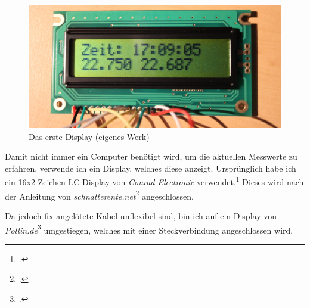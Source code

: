 \begin{figure}[h]
  \centering
     \includegraphics[width=\textwidth]{figures/erstes_display.jpg}
  \caption{Das erste Display (eigenes Werk)}
  \label{fig:erstes_display}
\end{figure}

Damit nicht immer ein Computer benötigt wird, um die aktuellen Messwerte zu erfahren, verwende ich ein Display, welches diese anzeigt. Ursprünglich habe ich ein 16x2 Zeichen \gls{LC-Display} von \emph{Conrad Electronic} verwendet.\footcite{conrad_datenblatt}
Dieses wird nach der Anleitung von \emph{schnatterente.net}\footcite{schnatterente} angeschlossen.

Da jedoch fix angelötete Kabel unflexibel sind, bin ich auf ein Display von \emph{Pollin.de}\footcite{display_pollin} umgestiegen, welches mit einer Steckverbindung angeschlossen wird.

